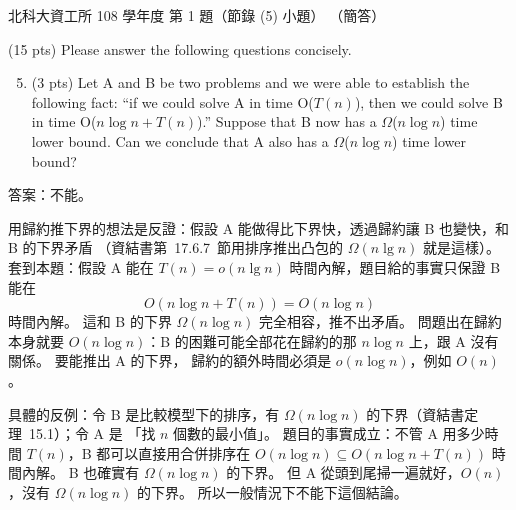 \begin{pastexam}[label={px:ntut-108-ci-03}]{北科大資工所 108 學年度 第 1 題（節錄 (5) 小題）}
（簡答）

(15 pts) Please answer the following questions concisely.
\begin{enumerate}[label=(\arabic*)]
\setcounter{enumi}{4}
\item (3 pts) Let A and B be two problems and we were able to establish the following fact: ``if we
could solve A in time O($T(n)$), then we could solve B in time O($n\log n+T(n)$).'' Suppose that B
now has a $\Omega$($n\log n$) time lower bound. Can we conclude that A also has a $\Omega$($n\log n$)
time lower bound?
\end{enumerate}
\end{pastexam}

\begin{pastsoln}
答案：不能。

用歸約推下界的想法是反證：假設 A 能做得比下界快，透過歸約讓 B 也變快，和 B 的下界矛盾
（資結書第~17.6.7~節用排序推出凸包的 $\Omega(n \lg n)$ 就是這樣）。 套到本題：假設 A 能在
$T(n) = o(n \lg n)$ 時間內解，題目給的事實只保證 B 能在
\[
O(n \log n + T(n)) = O(n \log n)
\]
時間內解。 這和 B 的下界 $\Omega(n \log n)$ 完全相容，推不出矛盾。 問題出在歸約本身就要
$O(n \log n)$：B 的困難可能全部花在歸約的那 $n \log n$ 上，跟 A 沒有關係。 要能推出 A 的下界，
歸約的額外時間必須是 $o(n \log n)$，例如 $O(n)$。

具體的反例：令 B 是比較模型下的排序，有 $\Omega(n \log n)$ 的下界（資結書定理~15.1）；令 A 是
「找 $n$ 個數的最小值」。 題目的事實成立：不管 A 用多少時間 $T(n)$，B 都可以直接用合併排序在
$O(n \log n) \subseteq O(n \log n + T(n))$ 時間內解。 B 也確實有 $\Omega(n \log n)$ 的下界。 但 A
從頭到尾掃一遍就好，$O(n)$，沒有 $\Omega(n \log n)$ 的下界。 所以一般情況下不能下這個結論。
\end{pastsoln}
